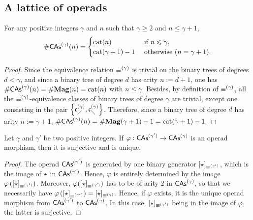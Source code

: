 \subsection{A lattice of operads}

\begin{Lemma} \label{lem:first_dimensions_CAs}
    For any positive integers $\gamma$ and $n$ such that $\gamma \geq 2$
    and $n \leq \gamma + 1$,
    \begin{equation}
        \# \mathsf{CAs}^{(\gamma)}(n) =
        \begin{cases}
            \mathrm{cat}(n)
                & \mbox{ if } n \leqslant \gamma, \\
            \mathrm{cat}(\gamma + 1) - 1
                & \mbox{ otherwise } (n = \gamma + 1).
        \end{cases}
    \end{equation}
\end{Lemma}
\begin{proof}
    Since the equivalence relation $\operatorname{\equiv}^{(\gamma)}$ is trivial on the
    binary trees of degrees $d < \gamma$, and since a binary tree of
    degree $d$ has arity $n := d + 1$, one has
    $\# \mathsf{CAs}^{(\gamma)}(n) = \# \mathbf{Mag}(n) = \mathrm{cat}(n)$ with $n \leq \gamma$.
    Besides, by definition of $\operatorname{\equiv}^{(\gamma)}$, all the
    $\operatorname{\equiv}^{(\gamma)}$-equivalence classes of binary trees of degree
    $\gamma$ are trivial, except one consisting in the pair
    $\left\{\mathfrak{c}^{(\gamma)}_{\diagup}, \mathfrak{c}^{(\gamma)}_{\diagdown}\right\}$. Therefore, since a
    binary tree of degree $d$ has arity $n := \gamma + 1$,
    \begin{math}
        \# \mathsf{CAs}^{(\gamma)}(n)
        = \# \mathbf{Mag}(\gamma + 1) - 1
        = \mathrm{cat}(\gamma + 1) - 1.
    \end{math}
\end{proof}
\medbreak

\begin{Lemma} \label{lem:surjective_morphisms_CAs}
    Let $\gamma$ and $\gamma'$ be two positive integers. If
    $\varphi:\mathsf{CAs}^{(\gamma')} \to \mathsf{CAs}^{(\gamma)}$ is an operad morphism, then
    it is surjective and is unique.
\end{Lemma}
\begin{proof}
    The operad $\mathsf{CAs}^{(\gamma')}$ is generated by one binary generator
    $[\operatorname{\star}]_{\operatorname{\equiv}^{(\gamma')}}$, which is the image of $\operatorname{\star}$
    in $\mathsf{CAs}^{(\gamma')}$. Hence, $\varphi$ is entirely determined by the
    image $\varphi\left([\operatorname{\star}]_{\operatorname{\equiv}^{(\gamma')}}\right)$.
    Moreover, $\varphi([\operatorname{\star}]_{\operatorname{\equiv}^{(\gamma')}})$ has to be of
    arity $2$ in $\mathsf{CAs}^{(\gamma)}$, so that we necessarily have
    \begin{math}
        \varphi\left([\operatorname{\star}]_{\operatorname{\equiv}^{(\gamma')}}\right)
        =
        [\operatorname{\star}]_{\operatorname{\equiv}^{(\gamma)}}.
    \end{math}
    Hence, if $\varphi$ exists, it is the unique operad morphism from
    $\mathsf{CAs}^{(\gamma')}$ to $\mathsf{CAs}^{(\gamma)}$. In this case,
    $[\operatorname{\star}]_{\operatorname{\equiv}^{(\gamma')}}$ being in the image of $\varphi$,
    the latter is surjective.
\end{proof}
\medbreak

